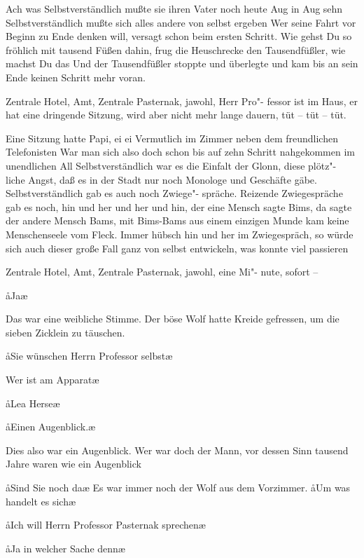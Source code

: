 Ach was\ausr{} Selbstverständlich mußte sie ihren Vater noch heute
Aug in Aug sehn\ausr{} Selbstverständlich mußte sich alles andere
von selbst ergeben\ausr{} Wer seine Fahrt vor Beginn zu Ende
denken will, versagt schon beim ersten Schritt. Wie gehst Du
so fröhlich mit tausend Füßen dahin, frug die Heuschrecke den
Tausendfüßler, wie machst Du das\frag{} Und der Tausendfüßler
stoppte und überlegte und kam bis an sein Ende keinen
Schritt mehr voran.

Zentrale Hotel, Amt, Zentrale Pasternak, jawohl, Herr Pro"-%
fessor ist im Haus, er hat eine dringende Sitzung, wird aber
nicht mehr lange dauern, tüt -- tüt -- tüt.

Eine Sitzung hatte Papi, ei ei\frag{} Vermutlich im Zimmer neben
dem freundlichen Telefonisten\frag{} War man sich also doch schon
bis auf zehn Schritt nahgekommen im unendlichen All\frag{}
Selbstverständlich war es die Einfalt der Glonn, diese plötz"-%
liche Angst, daß es in der Stadt nur noch Monologe und
Geschäfte gäbe. Selbstverständlich gab es auch noch Zwiege"-%
spräche. Reizende Zwiegespräche gab es noch, hin und her und
her und hin, der eine Mensch sagte Bims, da sagte der andere
Mensch Bams, mit Bims-Bams aus einem einzigen Munde
kam keine Menschenseele vom Fleck. Immer hübsch hin und
her im Zwiegespräch, so würde sich auch dieser große Fall
ganz von selbst entwickeln, was konnte viel passieren\ausr{}

Zentrale Hotel, Amt, Zentrale Pasternak, jawohl, eine Mi"-%
nute, sofort --

\aa{}Ja\frag{}\ae{}

Das war eine weibliche Stimme. Der böse Wolf hatte Kreide
gefressen, um die sieben Zicklein zu täuschen.

\aa{}Sie wünschen Herrn Professor selbst\frag{}\ae{}

\aanah{}Wer ist am Apparat\frag{}\ae{}

\aa{}Lea Herse\punkte{}\ae{}

\aa{}Einen Augenblick.\ae{}

Dies also war ein Augenblick. Wer war doch der Mann, vor
dessen Sinn tausend Jahre waren wie ein Augenblick\frag{}

\aa{}Sind Sie noch da\frag{}\ae{} Es war immer noch der Wolf aus dem
Vorzimmer. \aa{}Um was handelt es sich\frag{}\ae{}

\aa{}Ich will Herrn Professor Pasternak sprechen\punkte{}\ae{}

\aa{}Ja in welcher Sache denn\frag{}\ae{}

